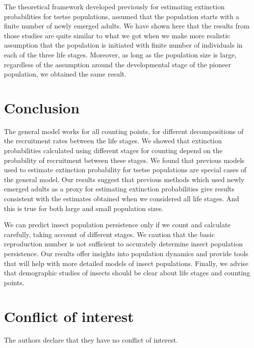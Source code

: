 \documentclass[smallextended]{svjour3}
\begin{document}
The theoretical framework developed previously for estimating extinction probabilities for tsetse populations, assumed that the population starts with a finite number of newly emerged adults. We have shown here that the results from those studies are quite similar to what we got when we make more realistic assumption that the population is initiated with finite number of individuals in each of the three life stages. Moreover, as long as the population size is large, regardless of the assumption around the developmental stage of the pioneer population, we obtained the same result. 

  

\section{Conclusion}
\label{section9}
The general model works for all counting points, for different decompositions of the recruitment rates between the life stages. We showed that extinction probabilities calculated using different stages for counting depend on the probability of recruitment between these stages. We found that previous models used to estimate extinction probability for tsetse populations are special cases of the general model. Our results suggest that previous methods which used newly emerged adults as a proxy for estimating extinction probabilities give  results consistent with the estimates obtained when we considered all life stages. And this is true for both large and small population sizes.

We can predict insect population persistence only if we count and calculate carefully, taking account of different stages. We caution that the basic reproduction number is not sufficient to accurately determine insect population persistence. Our results offer insights into population dynamics and provide tools that will help with more detailed models of insect populations. Finally, we advise that demographic studies of insects should be clear about life stages and counting points.



%
 \section*{Conflict of interest}
%
 The authors declare that they have no conflict of interest.
\end{document}
